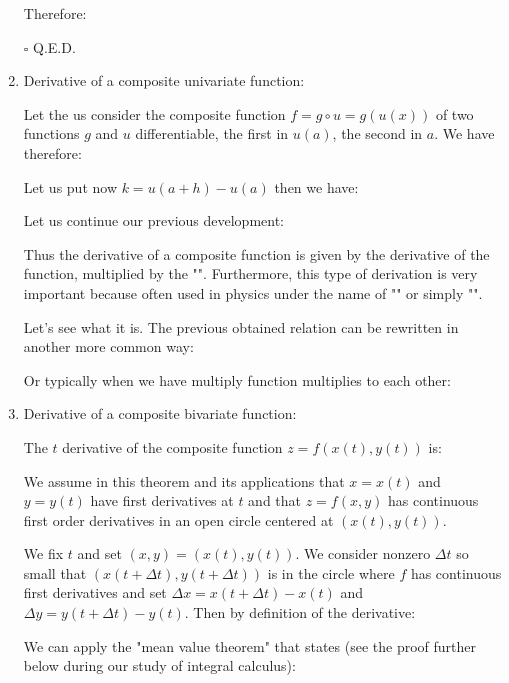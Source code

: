 \begin{enumerate}
\begin{dem}
		 	Therefore:
		 	
		 	\begin{flushright}
				$\square$  Q.E.D.
			\end{flushright}
		 \end{dem}
		 \item Derivative of a composite univariate function:
		 
		 Let the us consider the composite function $f=g \circ u=g(u(x))$ of two functions $g$ and $u$ differentiable, the first in $u (a)$, the second in $a$. We have therefore:
		 
		 Let us put now $k=u(a+h)-u(a)$ then we have:
		  
		 Let us continue our previous development:
		  
		 Thus the derivative of a composite function is given by the derivative of the function, multiplied by the "". Furthermore, this type of derivation is very important because often used in physics under the name of "" or simply "".
		 
		 Let's see what it is. The previous obtained relation can be rewritten in another more common way:
		 
		 Or typically when we have multiply function multiplies to each other:
		 
		 
		 \item Derivative of a composite bivariate function:
		 \begin{theorem}
		 The $t$ derivative of the composite function $z=f(x(t),y(t))$ is:
		  
		 We assume in this theorem and its applications that $x=x(t)$ and $y=y(t)$ have first derivatives at $t$ and that $z=f(x,y)$ has continuous first order derivatives in an open circle centered at $(x(t),y(t))$.
		 \end{theorem}
		 \begin{dem}
		 	We fix $t$ and set $(x,y)=(x(t),y(t))$. We consider nonzero $\Delta t$ so small that $(x(t+\Delta t),y(t+\Delta t))$ is in the circle where $f$ has continuous first derivatives and set $\Delta x=x(t+\Delta t)-x(t)$ and $\Delta y=y(t+\Delta t)-y(t)$. Then by definition of the derivative:
		 	
			We can apply the "mean value theorem" that states (see the proof further below during our study of integral calculus):
						

\end{dem}
\end{enumerate}
